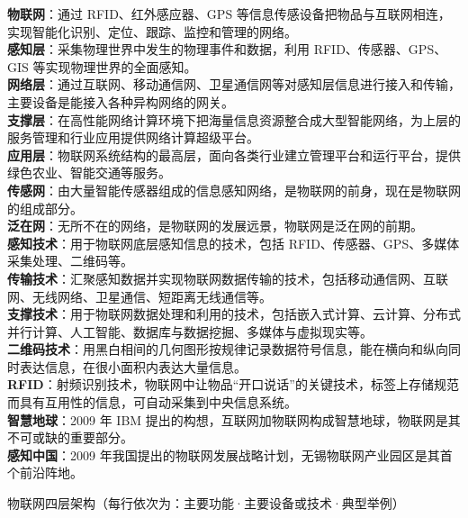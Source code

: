 \documentclass[a4paper,11pt]{article}
\begin{document}
\begin{keyterms}
\textbf{物联网}：通过 RFID、红外感应器、GPS 等信息传感设备把物品与互联网相连，实现智能化识别、定位、跟踪、监控和管理的网络。\\
\textbf{感知层}：采集物理世界中发生的物理事件和数据，利用 RFID、传感器、GPS、GIS 等实现物理世界的全面感知。\\
\textbf{网络层}：通过互联网、移动通信网、卫星通信网等对感知层信息进行接入和传输，主要设备是能接入各种异构网络的网关。\\
\textbf{支撑层}：在高性能网络计算环境下把海量信息资源整合成大型智能网络，为上层的服务管理和行业应用提供网络计算超级平台。\\
\textbf{应用层}：物联网系统结构的最高层，面向各类行业建立管理平台和运行平台，提供绿色农业、智能交通等服务。\\
\textbf{传感网}：由大量智能传感器组成的信息感知网络，是物联网的前身，现在是物联网的组成部分。\\
\textbf{泛在网}：无所不在的网络，是物联网的发展远景，物联网是泛在网的前期。\\
\textbf{感知技术}：用于物联网底层感知信息的技术，包括 RFID、传感器、GPS、多媒体采集处理、二维码等。\\
\textbf{传输技术}：汇聚感知数据并实现物联网数据传输的技术，包括移动通信网、互联网、无线网络、卫星通信、短距离无线通信等。\\
\textbf{支撑技术}：用于物联网数据处理和利用的技术，包括嵌入式计算、云计算、分布式并行计算、人工智能、数据库与数据挖掘、多媒体与虚拟现实等。\\
\textbf{二维码技术}：用黑白相间的几何图形按规律记录数据符号信息，能在横向和纵向同时表达信息，在很小面积内表达大量信息。\\
\textbf{RFID}：射频识别技术，物联网中让物品“开口说话”的关键技术，标签上存储规范而具有互用性的信息，可自动采集到中央信息系统。\\
\textbf{智慧地球}：2009 年 IBM 提出的构想，互联网加物联网构成智慧地球，物联网是其不可或缺的重要部分。\\
\textbf{感知中国}：2009 年我国提出的物联网发展战略计划，无锡物联网产业园区是其首个前沿阵地。
\end{keyterms}

\needspace{6cm}
\begin{contrast}{物联网四层架构（每行依次为：主要功能·主要设备或技术·典型举例）}
\end{contrast}
\end{document}
